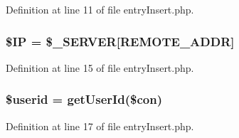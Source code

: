 Definition at line 11 of file entry\+Insert.\+php.

\subsubsection[{\texorpdfstring{\$\+IP}{$IP}}]{\setlength{\rightskip}{0pt plus 5cm}\$IP = \$\+\_\+\+S\+E\+R\+V\+ER\mbox{[}\textquotesingle{}R\+E\+M\+O\+T\+E\+\_\+\+A\+D\+DR\textquotesingle{}\mbox{]}}\hypertarget{entry_insert_8php_a04624d7a6de9eb3d2621472352bb6dcb}{}\label{entry_insert_8php_a04624d7a6de9eb3d2621472352bb6dcb}


Definition at line 15 of file entry\+Insert.\+php.

\subsubsection[{\texorpdfstring{\$userid}{$userid}}]{\setlength{\rightskip}{0pt plus 5cm}\$userid = {\bf get\+User\+Id}(\$con)}\hypertarget{entry_insert_8php_ae3f4f74a2aff9863a4767269a47aea11}{}\label{entry_insert_8php_ae3f4f74a2aff9863a4767269a47aea11}


Definition at line 17 of file entry\+Insert.\+php.

